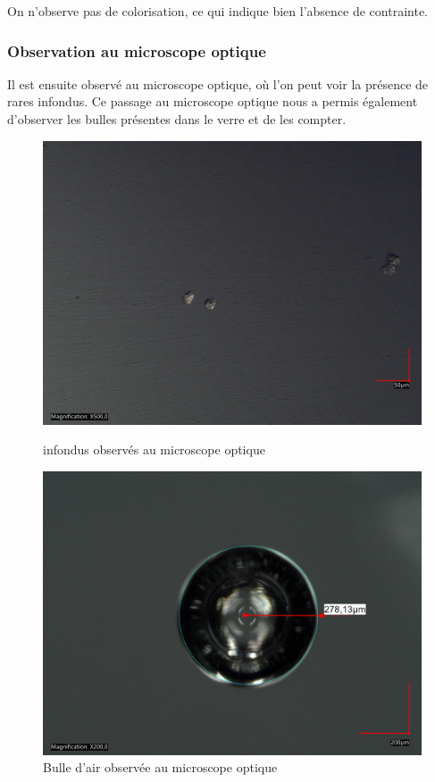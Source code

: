 \documentclass{article}
\begin{document}
On n'observe pas de colorisation, ce qui indique bien l'absence de contrainte.

\subsubsection{Observation au microscope optique}

Il est ensuite observé au microscope optique, où l'on peut voir la présence de rares infondus. Ce passage au microscope optique nous a permis également d'observer les bulles présentes dans le verre et de les compter.

\begin{figure}[h!]
    \centering
    \begin{minipage}{0.45\textwidth}
        \centering
        \includegraphics[width=\textwidth]{photos/impuetée2.jpg}
        \caption{infondus observés au microscope optique}
    \end{minipage}
    \hspace{0.5cm}
    \begin{minipage}{0.45\textwidth}
        \centering
        \includegraphics[width=\textwidth]{photos/rayon 1 modified.jpg}
        \caption{Bulle d'air observée au microscope optique}
    \end{minipage}
\end{figure}
\end{document}
